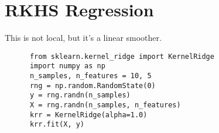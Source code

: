 \section{RKHS Regression}

  This is not local, but it's a linear smoother. 

  \begin{code}
    \begin{lstlisting}
      from sklearn.kernel_ridge import KernelRidge
      import numpy as np
      n_samples, n_features = 10, 5
      rng = np.random.RandomState(0)
      y = rng.randn(n_samples)
      X = rng.randn(n_samples, n_features)
      krr = KernelRidge(alpha=1.0)
      krr.fit(X, y)
    \end{lstlisting}
  \end{code}


